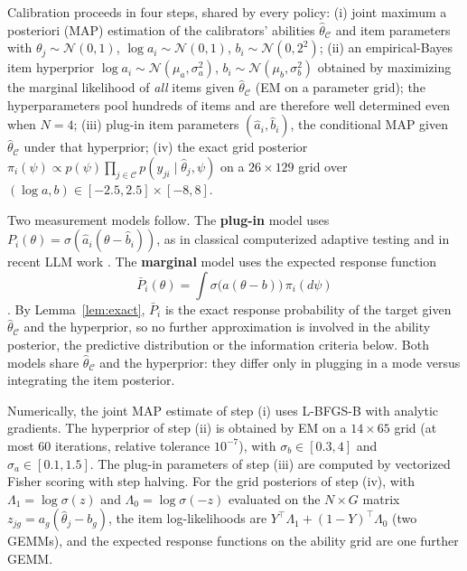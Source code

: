 Calibration proceeds in four steps, shared by every policy:
(i) joint maximum a posteriori (MAP) estimation of the calibrators' abilities
$\hat\theta_{\mathcal C}$ and item parameters with $\theta_j\sim\mathcal N(0,1)$,
$\log a_i\sim\mathcal N(0,1)$, $b_i\sim\mathcal N(0,2^2)$;
(ii) an empirical-Bayes item hyperprior
$\log a_i\sim\mathcal N(\mu_a,\sigma_a^2)$, $b_i\sim\mathcal N(\mu_b,\sigma_b^2)$ obtained by
maximizing the marginal likelihood of \emph{all} items given
$\hat\theta_{\mathcal C}$ (EM on a parameter grid); the hyperparameters pool
hundreds of items and are therefore well determined even when $N=4$;
(iii) plug-in item parameters $(\hat a_i,\hat b_i)$, the conditional MAP given
$\hat\theta_{\mathcal C}$ under that hyperprior;
(iv) the exact grid posterior $\pi_i(\psi)\propto p(\psi)\prod_{j\in\mathcal C}p(y_{ji}\mid\hat\theta_j,\psi)$
on a $26\times129$ grid over $(\log a,b)\in[-2.5,2.5]\times[-8,8]$.

Two measurement models follow. The \textbf{plug-in} model uses
$P_i(\theta)=\sigma(\hat a_i(\theta-\hat b_i))$, as in classical computerized
adaptive testing and in recent LLM work \citep{hofmann2025fluid,li2026atlas}.
The \textbf{marginal} model uses the expected response function
\begin{equation}\label{eq:erf}
\bar P_i(\theta)=\int\sigma\big(a(\theta-b)\big)\,\pi_i(d\psi)
\end{equation}
\citep{mislevy1994erf}. By Lemma~\ref{lem:exact}, $\bar P_i$ is the exact response
probability of the target given $\hat\theta_{\mathcal C}$ and the hyperprior, so no
further approximation is involved in the ability posterior, the predictive distribution
or the information criteria below. Both models share $\hat\theta_{\mathcal C}$ and the
hyperprior: they differ only in plugging in a mode versus integrating the item
posterior.

Numerically, the joint MAP estimate of step (i) uses L-BFGS-B with analytic gradients. The
hyperprior of step (ii) is obtained by EM on a $14\times65$ grid (at most 60 iterations,
relative tolerance $10^{-7}$), with $\sigma_b\in[0.3,4]$ and $\sigma_a\in[0.1,1.5]$. The
plug-in parameters of step (iii) are computed by vectorized Fisher scoring with step halving.
For the grid posteriors of step (iv), with $\Lambda_1=\log\sigma(z)$ and
$\Lambda_0=\log\sigma(-z)$ evaluated on the $N\times G$ matrix $z_{jg}=a_g(\hat\theta_j-b_g)$,
the item log-likelihoods are $Y^\top\Lambda_1+(1-Y)^\top\Lambda_0$ (two GEMMs), and the
expected response functions on the ability grid are one further GEMM.

